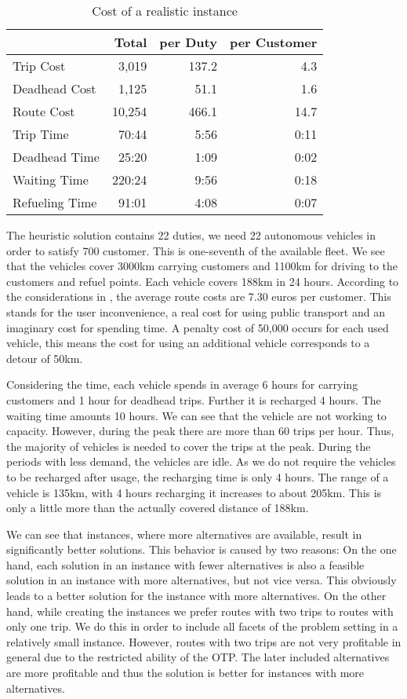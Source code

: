 \begin{table}[htb]
	\centering
	\begin{tabular}{l|rrr}
		\toprule
		& Total & per Duty & per Customer \\
		\midrule
		Trip Cost     &  3,019 & 137.2 &  4.3 \\
		Deadhead Cost &  1,125 &  51.1 &  1.6 \\
		Route Cost    & 10,254 & 466.1 & 14.7 \\
		\midrule
		Trip Time      &  70:44 & 5:56 & 0:11 \\
		Deadhead Time  &  25:20 & 1:09 & 0:02 \\
		Waiting Time   & 220:24 & 9:56 & 0:18 \\
		Refueling Time &  91:01 & 4:08 & 0:07 \\
		\bottomrule
	\end{tabular}
	\caption{Cost of a realistic instance}
	\label{tab:results:realistic}
\end{table}

The heuristic solution contains 22 duties, \ie we need 22 autonomous vehicles in order to satisfy 700 customer. This is one-seventh of the available fleet. We see that the vehicles cover 3000km carrying customers and 1100km for driving to the customers and refuel points. Each vehicle covers 188km in 24 hours. According to the considerations in , the average route costs are 7.30 euros per customer. This stands for the user inconvenience, \ie a real cost for using public transport and an imaginary cost for spending time. A penalty cost of 50,000 occurs for each used vehicle, this means the cost for using an additional vehicle corresponds to a detour of 50km.

Considering the time, each vehicle spends in average 6 hours for carrying customers and 1 hour for deadhead trips. Further it is recharged 4 hours. The waiting time amounts 10 hours. We can see that the vehicle are not working to capacity. However, during the peak there are more than 60 trips per hour. Thus, the majority of vehicles is needed to cover the trips at the peak. During the periods with less demand, the vehicles are idle. As we do not require the vehicles to be recharged after usage, the recharging time is only 4 hours. The range of a vehicle is 135km, with 4 hours recharging it increases to about 205km. This is only a little more than the actually covered distance of 188km.

We can see that instances, where more alternatives are available, result in significantly better solutions. This behavior is caused by two reasons: On the one hand, each solution in an instance with fewer alternatives is also a feasible solution in an instance with more alternatives, but not vice versa. This obviously leads to a better solution for the instance with more alternatives. On the other hand, while creating the instances we prefer routes with two trips to routes with only one trip. We do this in order to include all facets of the problem setting in a relatively small instance. However, routes with two trips are not very profitable in general due to the restricted ability of the OTP. The later included alternatives are more profitable and thus the solution is better for instances with more alternatives.